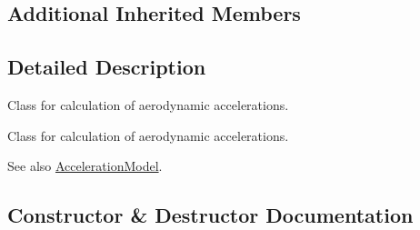 \subsection*{Additional Inherited Members}


\subsection{Detailed Description}
Class for calculation of aerodynamic accelerations. 

Class for calculation of aerodynamic accelerations. \begin{DoxySeeAlso}{See also}
\hyperlink{classtudat_1_1basic__astrodynamics_1_1AccelerationModel_a36f72cf81cc4ff658919a1b92cdc33ad}{Acceleration\+Model}. 
\end{DoxySeeAlso}


\subsection{Constructor \& Destructor Documentation}
